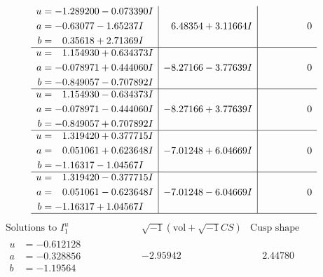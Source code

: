 \documentclass[1p]{elsarticle_modified}
\theoremstyle{definition}
\newcommand{\I}{\sqrt{-1}}
\begin{document}
$$\begin{array}{c|c|c}
\begin{aligned}
u &= -1.289200 - 0.073390 I \\
a &= -0.63077 - 1.65237 I \\
b &= \phantom{-}0.35618 + 2.71369 I\end{aligned}
 & \phantom{-}6.48354 + 3.11664 I & \phantom{-0.000000 } 0 \\ \hline\begin{aligned}
u &= \phantom{-}1.154930 + 0.634373 I \\
a &= -0.078971 + 0.444060 I \\
b &= -0.849057 - 0.707892 I\end{aligned}
 & -8.27166 - 3.77639 I & \phantom{-0.000000 } 0 \\ \hline\begin{aligned}
u &= \phantom{-}1.154930 - 0.634373 I \\
a &= -0.078971 - 0.444060 I \\
b &= -0.849057 + 0.707892 I\end{aligned}
 & -8.27166 + 3.77639 I & \phantom{-0.000000 } 0 \\ \hline\begin{aligned}
u &= \phantom{-}1.319420 + 0.377715 I \\
a &= \phantom{-}0.051061 + 0.623648 I \\
b &= -1.16317 - 1.04567 I\end{aligned}
 & -7.01248 + 6.04669 I & \phantom{-0.000000 } 0 \\ \hline\begin{aligned}
u &= \phantom{-}1.319420 - 0.377715 I \\
a &= \phantom{-}0.051061 - 0.623648 I \\
b &= -1.16317 + 1.04567 I\end{aligned}
 & -7.01248 - 6.04669 I & \phantom{-0.000000 } 0\\
 \hline 
 \end{array}$$\newpage$$\begin{array}{c|c|c}  
\text{Solutions to }I^u_{1}& \I (\text{vol} + \sqrt{-1}CS) & \text{Cusp shape}\\
 \hline 
\begin{aligned}
u &= -0.612128\phantom{ +0.000000I} \\
a &= -0.328856\phantom{ +0.000000I} \\
b &= -1.19564\phantom{ +0.000000I}\end{aligned}
 & -2.95942\phantom{ +0.000000I} & \phantom{-}2.44780\phantom{ +0.000000I} \\ \hline\begin{aligned}

\end{aligned}
\end{array}$$
\end{document}
